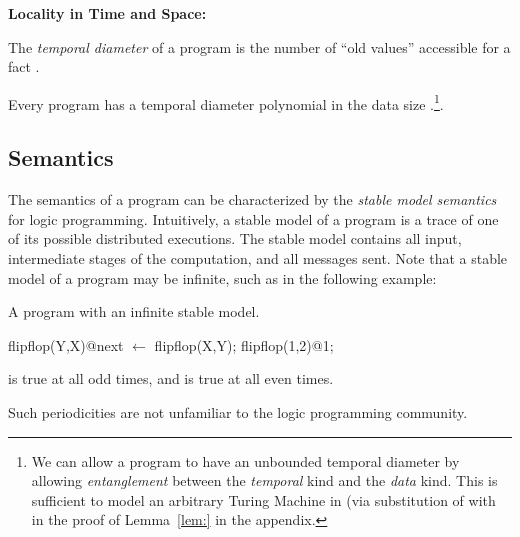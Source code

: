 {\bf Locality in Time and Space:}
\begin{definition}
The {\em temporal diameter} of a \lang program is the number of ``old values'' accessible for a fact .
\end{definition}

Every \lang program has a temporal diameter polynomial in the data size .\footnote{We can allow a program to have an unbounded temporal diameter by allowing {\em entanglement} between the {\em temporal} kind and the {\em data} kind.  This is sufficient to model an arbitrary Turing Machine in \lang (via substitution of  with  in the proof of Lemma~\ref{lem:} in the appendix.}.


%

\subsection{Semantics}
The semantics of a \lang program can be characterized by the {\em stable model semantics}~\cite{stable-model} for logic programming.  Intuitively, a stable model of a \lang program is a trace of one of its possible distributed executions.  The stable model contains all input, intermediate stages of the computation, and all messages sent.  Note that a stable model of a \lang program may be infinite, such as in the following example:

\begin{example}
\label{ex:flipflop}
A \lang program with an infinite stable model.

\begin{Dedalus}
flipflop(Y,X)@next \(\leftarrow\) flipflop(X,Y);
flipflop(1,2)@1;
\end{Dedalus}
\end{example}

 is true at all odd times, and  is true at all even times.

Such periodicities are not unfamiliar to the logic programming community.  

